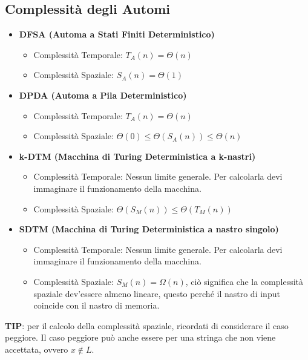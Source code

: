 \subsection{Complessità degli Automi}
\begin{itemize}
    \item \textbf{DFSA (Automa a Stati Finiti Deterministico)}
    \begin{itemize}
        \item Complessità Temporale: $T_A(n) = \Theta(n)$
        \item Complessità Spaziale: $S_A(n) = \Theta(1)$
    \end{itemize}

    \item \textbf{DPDA (Automa a Pila Deterministico)}
    \begin{itemize}
        \item Complessità Temporale: $T_A(n) = \Theta(n)$
        \item Complessità Spaziale: $\Theta(0) \le \Theta(S_A(n)) \le \Theta(n)$
    \end{itemize}

    \item \textbf{k-DTM (Macchina di Turing Deterministica a k-nastri)}
    \begin{itemize}
        \item Complessità Temporale: Nessun limite generale. Per calcolarla devi immaginare il funzionamento della macchina.
        \item Complessità Spaziale: $\Theta(S_M(n)) \le \Theta(T_M(n))$
    \end{itemize}

    \item \textbf{SDTM (Macchina di Turing Deterministica a nastro singolo)}
    \begin{itemize}
        \item Complessità Temporale: Nessun limite generale. Per calcolarla devi immaginare il funzionamento della macchina.
        \item Complessità Spaziale: $S_M(n) = \Omega(n)$, ciò significa che la complessità spaziale dev'essere almeno lineare, questo perché il nastro di input coincide con il nastro di memoria.
    \end{itemize}
\end{itemize}

\textbf{TIP}: per il calcolo della complessità spaziale, ricordati di considerare il caso peggiore. Il caso peggiore può anche essere per una stringa che non viene accettata, ovvero $x \notin L$.

